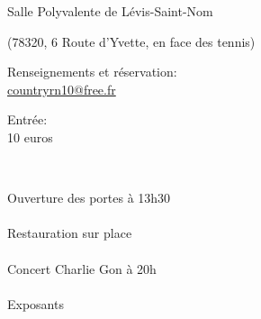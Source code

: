 \documentclass[12pt,a4paper]{article}
\begin{document}



\vspace*{15mm}

\fontsize{20pt}{20pt}\selectfont

Salle Polyvalente de Lévis-Saint-Nom

{\fontsize{14pt}{16pt}\selectfont
(78320, 6 Route d'Yvette, en face des tennis)}

\vspace*{5mm}

Renseignements et réservation: \\
\href{mailto:countryrn10@free.fr}{countryrn10@free.fr}

\vspace*{5mm}

Entrée: \\
10 euros

\vspace*{-30mm}
\vfill

~\hfill\begin{minipage}{0.35\linewidth}
  \begin{center}
    Ouverture des portes
    à 13h30\\
    ~\\
    Restauration
    sur place\\
    ~\\
    Concert Charlie Gon à 20h\\
    ~\\
    Exposants
\end{center}
\end{minipage}

\end{document}

